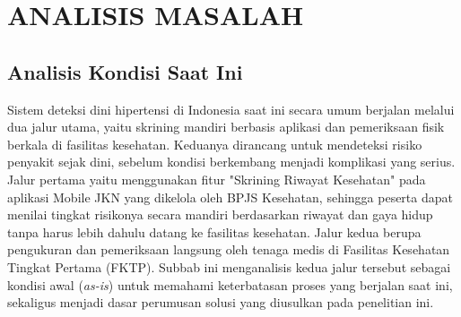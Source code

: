 \cleardoublepage
\chapter{ANALISIS MASALAH}
\label{chap:analisis-masalah}

\section{Analisis Kondisi Saat Ini}
Sistem deteksi dini hipertensi di Indonesia saat ini secara umum berjalan melalui dua jalur utama, yaitu skrining mandiri berbasis aplikasi dan pemeriksaan fisik berkala di fasilitas kesehatan. Keduanya dirancang untuk mendeteksi risiko penyakit sejak dini, sebelum kondisi berkembang menjadi komplikasi yang serius. Jalur pertama yaitu menggunakan fitur "Skrining Riwayat Kesehatan" pada aplikasi Mobile JKN yang dikelola oleh BPJS Kesehatan, sehingga peserta dapat menilai tingkat risikonya secara mandiri berdasarkan riwayat dan gaya hidup tanpa harus lebih dahulu datang ke fasilitas kesehatan. Jalur kedua berupa pengukuran dan pemeriksaan langsung oleh tenaga medis di Fasilitas Kesehatan Tingkat Pertama (FKTP). Subbab ini menganalisis kedua jalur tersebut sebagai kondisi awal (\emph{as-is}) untuk memahami keterbatasan proses yang berjalan saat ini, sekaligus menjadi dasar perumusan solusi yang diusulkan pada penelitian ini.

